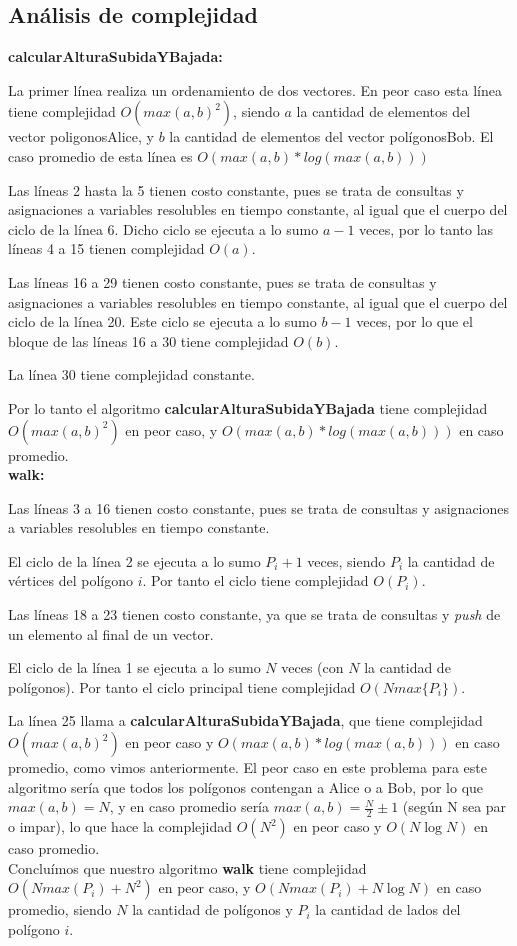 \subsection*{Análisis de complejidad}

\textbf{calcularAlturaSubidaYBajada:}

La primer línea realiza un ordenamiento de dos vectores. En peor caso esta línea tiene complejidad
$O(max(a,b)^2)$, siendo $a$ la cantidad de elementos del vector poligonosAlice, y $b$ la cantidad de
elementos del vector polígonosBob. El caso promedio de esta línea es $O(max(a,b)*log(max(a,b)))$

Las líneas 2 hasta la 5 tienen costo constante, pues se trata de consultas y asignaciones a variables
resolubles en tiempo constante, al igual que el cuerpo del ciclo de la línea 6.
Dicho ciclo se ejecuta a lo sumo $a-1$ veces, por lo tanto las líneas 4 a 15 tienen
complejidad $O(a)$.

Las líneas 16 a 29 tienen costo constante, pues se trata de consultas y asignaciones a variables
resolubles en tiempo constante, al igual que el cuerpo del ciclo de la línea 20. Este ciclo
se ejecuta a lo sumo $b-1$ veces, por lo que el bloque de las líneas 16 a 30 tiene complejidad $O(b)$.

La línea 30 tiene complejidad constante.

Por lo tanto el algoritmo {\bf calcularAlturaSubidaYBajada} tiene complejidad
$O(max(a,b)^2)$ en peor caso, y $O(max(a,b)*log(max(a,b)))$ en caso promedio.\\


\textbf{walk:}

Las líneas 3 a 16 tienen costo constante, pues se trata de consultas y
asignaciones a variables resolubles en tiempo constante.

El ciclo de la línea 2 se ejecuta a lo sumo $P_i+1$ veces, siendo $P_i$ la
cantidad de vértices del polígono $i$. Por tanto el ciclo tiene complejidad $O(P_i)$.

Las líneas 18 a 23 tienen costo constante, ya que se trata de consultas y
{\sl push} de un elemento al final de un vector.

El ciclo de la línea 1 se ejecuta a lo sumo $N$ veces (con $N$ la cantidad de polígonos).
Por tanto el ciclo principal tiene complejidad $O(Nmax\{P_i\})$.

La línea 25 llama a {\bf calcularAlturaSubidaYBajada}, que tiene complejidad
$O(max(a,b)^2)$ en peor caso y $O(max(a,b)*log(max(a,b)))$ en caso promedio,
como vimos anteriormente. El peor caso en este problema para este algoritmo
sería que todos los polígonos contengan a Alice o a Bob, por lo que $max(a,b)
= N$, y en caso promedio sería $max(a,b) = \frac{N}{2}\pm 1$ (según N sea par o impar),
lo que hace la complejidad $O(N^2)$ en peor caso y $O(N\log N)$ en caso
promedio.\\

Concluímos que nuestro algoritmo {\bf walk} tiene complejidad $O(Nmax(P_i)+N^2)$ en peor caso,
y $O(Nmax(P_i) + N\log N)$ en caso promedio, siendo $N$ la cantidad de polígonos y
$P_i$ la cantidad de lados del polígono $i$.

